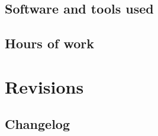 \documentclass[english]{article}
\begin{document}
\subsection{Software and tools used}

\subsection{Hours of work}

\newpage{}

\section{Revisions}

\subsection{Changelog}
\end{document}
